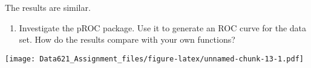 \documentclass[]{article}
\newenvironment{Shaded}{\begin{snugshade}}{\end{snugshade}}
\newcommand{\KeywordTok}[1]{\textcolor[rgb]{0.13,0.29,0.53}{\textbf{#1}}}
\newcommand{\DataTypeTok}[1]{\textcolor[rgb]{0.13,0.29,0.53}{#1}}
\newcommand{\DecValTok}[1]{\textcolor[rgb]{0.00,0.00,0.81}{#1}}
\newcommand{\OtherTok}[1]{\textcolor[rgb]{0.56,0.35,0.01}{#1}}
\newcommand{\OperatorTok}[1]{\textcolor[rgb]{0.81,0.36,0.00}{\textbf{#1}}}
\newcommand{\NormalTok}[1]{#1}
\providecommand{\tightlist}{%
  \setlength{\itemsep}{0pt}\setlength{\parskip}{0pt}}
\begin{document}
The results are similar.

\begin{enumerate}
\def\labelenumi{\arabic{enumi}.}
\setcounter{enumi}{12}
\tightlist
\item
  Investigate the pROC package. Use it to generate an ROC curve for the
  data set. How do the results compare with your own functions?
\end{enumerate}

\begin{Shaded}
\end{Shaded}

\texttt{[image: Data621\_Assignment\_files/figure-latex/unnamed-chunk-13-1.pdf]}
\end{document}
